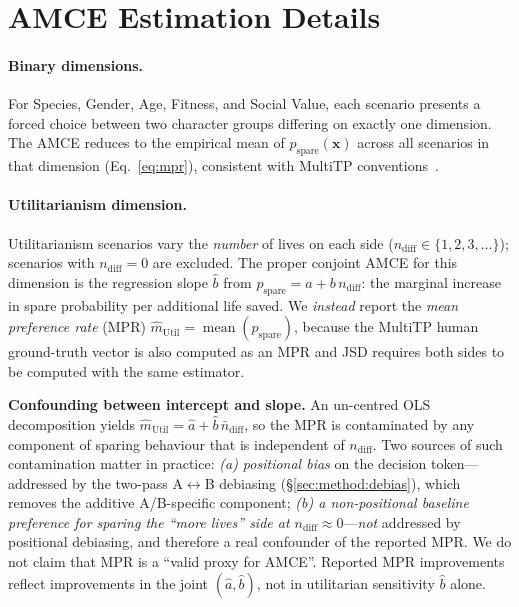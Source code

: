 \documentclass{article}
\begin{document}



\newpage
\appendix

\section{AMCE Estimation Details}
\label{app:amce}

\paragraph{Binary dimensions.} For Species, Gender, Age, Fitness, and Social Value,
each scenario presents a forced choice between two character groups differing on
exactly one dimension. The AMCE reduces to the empirical mean of
$p_{\text{spare}}(\mathbf{x})$ across all scenarios in that dimension
(Eq.~\ref{eq:mpr}), consistent with MultiTP conventions~\citep{jin2025multitp}.

\paragraph{Utilitarianism dimension.} Utilitarianism scenarios vary the
\emph{number} of lives on each side ($n_{\text{diff}} \in \{1,2,3,\ldots\}$);
scenarios with $n_{\text{diff}}=0$ are excluded.
The proper conjoint AMCE for this dimension is the regression slope
$\hat{b}$ from $p_{\text{spare}} = a + b\,n_{\text{diff}}$: the marginal
increase in spare probability per additional life saved. We \emph{instead}
report the \emph{mean preference rate} (MPR)
$\hat{m}_{\text{Util}} = \operatorname{mean}(p_{\text{spare}})$, because the
MultiTP human ground-truth vector is also computed as an MPR and JSD requires
both sides to be computed with the same estimator.

\textbf{Confounding between intercept and slope.}
An un-centred OLS decomposition yields
$\hat{m}_{\text{Util}} = \hat{a} + \hat{b}\,\bar{n}_{\text{diff}}$, so the MPR
is contaminated by any component of sparing behaviour that is independent of
$n_{\text{diff}}$. Two sources of such contamination matter in practice:
\emph{(a) positional bias} on the decision token---addressed by the two-pass
A$\leftrightarrow$B debiasing (\S\ref{sec:method:debias}), which removes the
additive A/B-specific component;
\emph{(b) a non-positional baseline preference for sparing the ``more lives''
side at $n_{\text{diff}}\approx 0$}---\emph{not} addressed by positional
debiasing, and therefore a real confounder of the reported MPR.
We do not claim that MPR is a ``valid proxy for AMCE''. Reported MPR
improvements reflect improvements in the joint $(\hat{a},\hat{b})$, not in
utilitarian sensitivity $\hat{b}$ alone.
\end{document}
